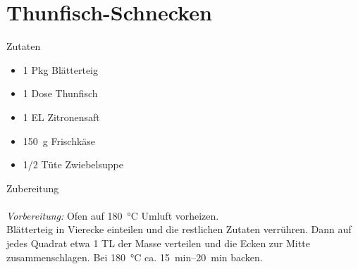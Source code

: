\section*{Thunfisch-Schnecken}
\ihead{}\ohead{}
\cfoot{}
{\Large Zutaten}
\begin{multicols}{2}
\begin{itemize}
    \item \num{1} Pkg Blätterteig
    \item \num{1} Dose Thunfisch
    \item \num{1} EL Zitronensaft
    \item \SI{150}{g} Frischkäse
    \item \num{1/2} Tüte Zwiebelsuppe
\end{itemize}
\end{multicols}
\noindent
{\Large Zubereitung}\\
\\
\textit{Vorbereitung:} Ofen auf \SI{180}{\celsius} Umluft vorheizen.\\
Blätterteig in Vierecke einteilen und die restlichen Zutaten verrühren. 
Dann auf jedes Quadrat etwa \num{1} TL der Masse verteilen und die Ecken zur Mitte zusammenschlagen.
Bei \SI{180}{\celsius} ca. \SIrange{15}{20}{min} backen.